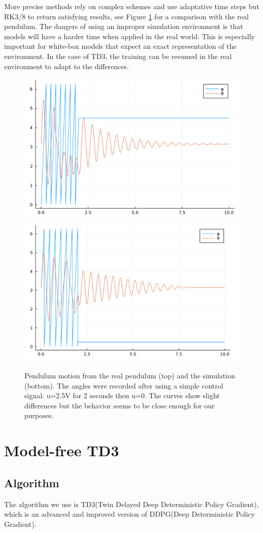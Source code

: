 \documentclass{LTHtwocol} %
\begin{document}
More precise methods rely on complex schemes and use adaptative time steps but RK3/8 to return satisfying results, see Figure \ref{fig:sim} for a comparison with the real pendulum. The dangers of using an improper simulation environment is that models will have a harder time when applied in the real world. This is especially important for white-box models that expect an exact representation of the environment. In the case of TD3, the training can be resumed in the real environment to adapt to the differences.

\begin{figure}
    \centering
    \includegraphics[width=0.7\columnwidth]{pic/real.png}
    \includegraphics[width=0.7\columnwidth]{pic/sim.png}
    \caption{Pendulum motion from the real pendulum (top) and the simulation (bottom). The angles were recorded after using a simple control signal: u=2.5V for 2 seconds then u=0. The curves show slight differences but the behavior seems to be close enough for our purposes.}
    \label{fig:sim}
\end{figure}

\section{Model-free TD3}

\subsection{Algorithm}
The algorithm we use is TD3(Twin Delayed Deep Deterministic Policy Gradient)\cite{fujimoto2018addressing}, which is an advanced and improved version of DDPG(Deep Deterministic Policy Gradient)\cite{lillicrap2015continuous}. 
\end{document}
